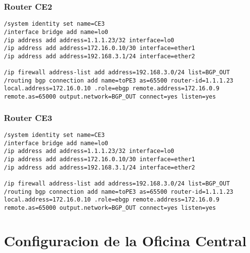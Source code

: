 \subsubsection*{Router CE2}
\begin{lstlisting}[language=RouterOS]
/system identity set name=CE3
/interface bridge add name=lo0
/ip address add address=1.1.1.23/32 interface=lo0
/ip address add address=172.16.0.10/30 interface=ether1
/ip address add address=192.168.3.1/24 interface=ether2

/ip firewall address-list add address=192.168.3.0/24 list=BGP_OUT
/routing bgp connection add name=toPE3 as=65500 router-id=1.1.1.23 local.address=172.16.0.10 .role=ebgp remote.address=172.16.0.9 remote.as=65000 output.network=BGP_OUT connect=yes listen=yes
\end{lstlisting}

\subsubsection*{Router CE3}
\begin{lstlisting}[language=RouterOS]
/system identity set name=CE3
/interface bridge add name=lo0
/ip address add address=1.1.1.23/32 interface=lo0
/ip address add address=172.16.0.10/30 interface=ether1
/ip address add address=192.168.3.1/24 interface=ether2

/ip firewall address-list add address=192.168.3.0/24 list=BGP_OUT
/routing bgp connection add name=toPE3 as=65500 router-id=1.1.1.23 local.address=172.16.0.10 .role=ebgp remote.address=172.16.0.9 remote.as=65000 output.network=BGP_OUT connect=yes listen=yes
\end{lstlisting}

\section{Configuracion de la Oficina Central}
